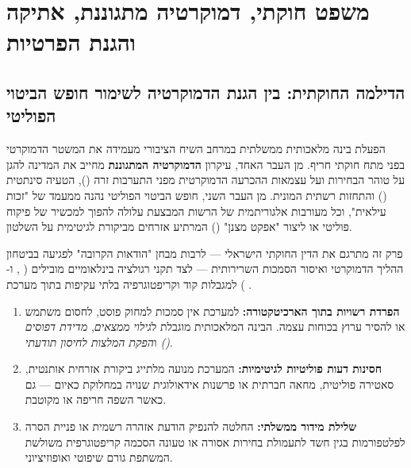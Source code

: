\chapter{משפט חוקתי, דמוקרטיה מתגוננת, אתיקה והגנת הפרטיות}
\label{ch:ethics}

\section{הדילמה החוקתית: בין הגנת הדמוקרטיה לשימור חופש הביטוי הפוליטי}
הפעלת בינה מלאכותית ממשלתית במרחב השיח הציבורי מעמידה את המשטר הדמוקרטי בפני מתח חוקתי חריף. מן העבר האחד, עיקרון \textbf{הדמוקרטיה המתגוננת} \cite{loewenstein1937, barak1988} מחייב את המדינה להגן על טוהר הבחירות ועל עצמאות ההכרעה הדמוקרטית מפני התערבות זרה (), הטעיה סינתטית () והתחזות רשתית המונית. מן העבר השני, חופש הביטוי הפוליטי נהנה ממעמד של "זכות עילאית", וכל מעורבות אלגוריתמית של הרשות המבצעת עלולה להפוך למכשיר של פיקוח פוליטי או ליצור "אפקט מצנן" () המרתיע אזרחים מביקורת לגיטימית על השלטון.

פרק זה מתרגם את הדין החוקתי הישראלי — לרבות מבחן "הודאות הקרובה" לפגיעה בביטחון ההליך הדמוקרטי ואיסור הסמכות השרירותית — לצד תקני רגולציה בינלאומיים מובילים ( \cite{eu_ai_act_2024},  \cite{eu_dsa_2022} ו- \cite{nist_ai_rmf_2023}) למגבלות קוד וקריפטוגרפיה בלתי עקיפות בתוך מערכת .

\begin{riskbox}
\begin{enumerate}
    \item \textbf{הפרדת רשויות בתוך הארכיטקטורה:} למערכת  אין סמכות למחוק פוסט, לחסום משתמש או להסיר ערוץ בכוחות עצמה. הבינה המלאכותית מוגבלת ל\emph{גילוי ממצאים}, \emph{מדידת דפוסים} ו\emph{הפקת המלצות לחיסון תודעתי ()}.
    \item \textbf{חסינות דעות פוליטיות לגיטימיות:} המערכת מנועה מלתייג ביקורת אזרחית אותנטית, סאטירה פוליטית, מחאה חברתית או פרשנות אידאולוגית שנויה במחלוקת כאיום — גם כאשר השפה חריפה או מקוטבת.
    \item \textbf{שלילת מידור ממשלתי:} החלטה להנפיק הודעת אזהרה רשמית או פניית הסרה לפלטפורמות בגין חשד לתעמולת בחירות אסורה או  טעונה הסכמה קריפטוגרפית משולשת המשתפת גורם שיפוטי ואופוזיציוני.
\end{enumerate}
\end{riskbox}

